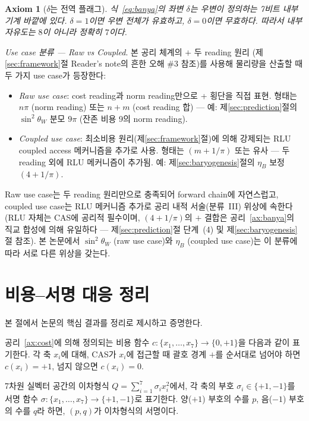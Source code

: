 \documentclass[entropy,article,submit,pdftex,oneauthor]{Definitions/mdpi}
\newtheorem{Axiom}{Axiom}
\begin{document}
\begin{Axiom}[$\delta$는 전역 플래그]\label{ax:delta}
식~\eqref{eq:banya}의 좌변 $\delta$는 우변이 정의하는 7비트 내부 기계 바깥에 있다. $\delta = 1$이면 우변 전체가 유효하고, $\delta = 0$이면 무효하다. 따라서 내부 자유도는 $8$이 아니라 정확히 $7$이다.
\end{Axiom}

\textit{Use case 분류 — Raw vs Coupled}\label{rem:stage-classification}. 본 공리 체계의 $+$ 두 reading 원리 (제\ref{sec:framework}절 Reader's note의 흔한 오해 \#3 참조)를 사용해 물리량을 산출할 때 두 가지 use case가 등장한다:
\begin{itemize}
\item \emph{Raw use case}: cost reading과 norm reading만으로 + 횡단을 직접 표현. 형태는 $n\pi$ (norm reading) 또는 $n + m$ (cost reading 합) — 예: 제\ref{sec:prediction}절의 $\sin^2\theta_W$ 분모 $9\pi$ (잔존 비용 9의 norm reading).
\item \emph{Coupled use case}: 최소비용 원리(제\ref{sec:framework}절)에 의해 강제되는 RLU coupled access 메커니즘을 추가로 사용. 형태는 $(m + 1/\pi)$ 또는 유사 — 두 reading 외에 RLU 메커니즘이 추가됨. 예: 제\ref{sec:baryogenesis}절의 $\eta_B$ 보정 $(4 + 1/\pi)$.
\end{itemize}
Raw use case는 두 reading 원리만으로 충족되어 forward chain에 자연스럽고, coupled use case는 RLU 메커니즘 추가로 공리 내적 서술(분류~III) 위상에 속한다 (RLU 자체는 CAS에 공리적 필수이며, $(4+1/\pi)$의 $+$ 결합은 공리~\ref{ax:banya}의 직교 합성에 의해 유일하다 --- 제\ref{sec:prediction}절 단계~(4) 및 제\ref{sec:baryogenesis}절 참조). 본 논문에서 $\sin^2\theta_W$ (raw use case)와 $\eta_B$ (coupled use case)는 이 분류에 따라 서로 다른 위상을 갖는다.

\section{비용--서명 대응 정리}
\label{sec:theorem}

본 절에서 논문의 핵심 결과를 정리로 제시하고 증명한다.

\begin{Definition}[비용 함수]
공리~\ref{ax:cost}에 의해 정의되는 비용 함수 $c: \{x_1, \ldots, x_7\} \to \{0, +1\}$을 다음과 같이 표기한다. 각 축 $x_i$에 대해, CAS가 $x_i$에 접근할 때 괄호 경계 $+$를 순서대로 넘어야 하면 $c(x_i) = +1$, 넘지 않으면 $c(x_i) = 0$.
\end{Definition}

\begin{Definition}[서명 함수]
7차원 실벡터 공간의 이차형식 $Q = \sum_{i=1}^{7} \sigma_i x_i^2$에서, 각 축의 부호 $\sigma_i \in \{+1, -1\}$를 서명 함수 $\sigma: \{x_1, \ldots, x_7\} \to \{+1, -1\}$로 표기한다. 양($+1$) 부호의 수를 $p$, 음($-1$) 부호의 수를 $q$라 하면, $(p,q)$가 이차형식의 서명이다.
\end{Definition}
\end{document}
